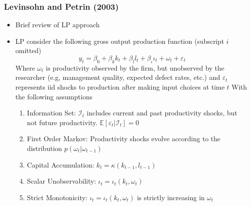 \documentclass{beamer}
\begin{document}

\begin{frame}
\frametitle{Levinsohn and Petrin (2003)}
\begin{itemize}
	\item Brief review of LP approach
	\pause
	\item LP consider the following gross output production function (subscript $i$ omitted)
	\begin{equation}
	y_{t}=\beta_{0}+\beta_{k}k_{t}+\beta_{l}l_{t}+\beta_{\iota}\iota_{t}+\omega_{t}+\varepsilon_{t}
	\end{equation}
	\pause
	Where $\omega_{t}$ is productivity observed by the firm, but unobserved by the researcher (e.g, management quality, expected defect rates, etc.) and $\varepsilon_{t}$ represents iid shocks to production after making input choices at time $t$
	With the following assumptions
	\medskip
	\begin{enumerate}
		\pause
		\item Information Set: $\mathcal{I}_{t}$ includes current and past productivity shocks, but not future productivity. $\mathbb{E}[\varepsilon_{t}|\mathcal{I}_{t}]=0$
		\item First Order Markov: Productivity shocks evolve according to the distribution $p(\omega_{t}|\omega_{t-1})$
		\item Capital Accumulation: $k_{t}=\kappa(k_{t-1}, l_{t-1})$
		\item Scalar Unobservability: $\iota_{t}=\iota_{t}(k_{t}, \omega_{t})$
		\item Strict Monotonicity: $\iota_{t}=\iota_{t}(k_{t}, \omega_{t})$ is strictly increasing in $\omega_{t}$
	\end{enumerate}
\end{itemize}
\end{frame}

\end{document}
